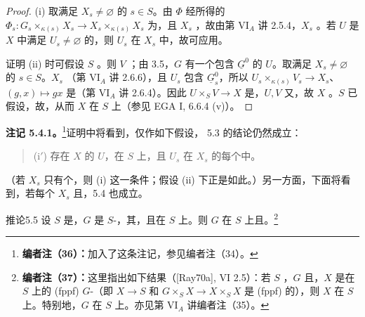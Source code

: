 \begin{proof}
(i) 取满足 $X_s\ne\varnothing$ 的 $s\in S$。由 $\Phi$ 经所得的 $\Phi_s:G_s\times_{\kappa(s)}X_s\to X_s\times_{\kappa(s)}X_s$ 为，且 $X_s$ ，故由第 VI$_A$ 讲 2.5.4，$X_s$ 。若 $U$ 是 $X$ 中满足 $U_s\ne\varnothing$ 的，则 $U_s$ 在 $X_s$ 中，故可应用。

证明 (ii) 时可假设 $S$ 。则 $V$ ；由 3.5，$G$ 有一个包含 $\underline G^0$ 的 $U$。取满足 $X_s\ne\varnothing$ 的 $s\in S$。$X_s$ （第 VI$_A$ 讲 2.6.6），且 $U_s$ 包含 $\underline G_s^0$，所以 $U_s\times_{\kappa(s)}V_s\to X_s$、$(g,x)\mapsto gx$ 是（第 VI$_A$ 讲 2.6.4）。因此 $U\times_SV\to X$ 是，$U,V$ 又，故 $X$ 。$S$ 已假设，故，从而 $X$ 在 $S$ 上（参见 EGA I, 6.6.4 (v)）。
\end{proof}
\textbf{注记 5.4.1。}\footnote{\textbf{编者注（36）：}加入了这条注记，参见编者注（34）。}证明中将看到，仅作如下假设， 5.3 的结论仍然成立：
\begin{quote}
(i$'$) 存在 $X$ 的 $U$，在 $S$ 上，且 $U_s$ 在 $X_s$ 的每个中。
\end{quote}
（若 $X_s$ 只有个，则 (i) 这一条件；假设 (ii) 下正是如此。）另一方面，下面将看到，若每个 $X_s$ 且，5.4 也成立。
\begin{SGAresult}{推论}{5.5}
设 $S$ 是，$G$ 是 $S$-，其，且在 $S$ 上。则 $G$ 在 $S$ 上且。\footnote{\textbf{编者注（37）：}这里指出如下结果（[Ray70a], VI 2.5）：若 $S$ ，$G$ 且，$X$ 是在 $S$ 上的 (fppf) $G$-（即 $X\to S$ 和 $G\times_SX\to X\times_SX$ 是 (fppf) 的），则 $X$ 在 $S$ 上。特别地，$G$ 在 $S$ 上。亦见第 VI$_A$ 讲编者注（35）。}
\end{SGAresult}
